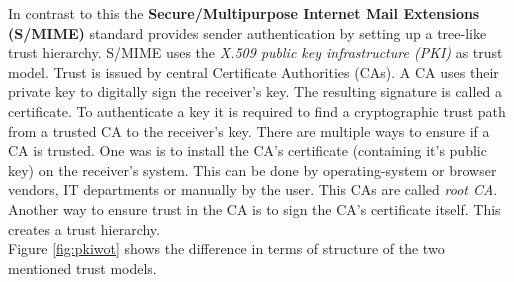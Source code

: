 In contrast to this the \textbf{Secure/Multipurpose Internet Mail Extensions (S/MIME)} standard provides sender authentication by setting up a tree-like trust hierarchy. S/MIME uses the \textit{X.509 public key infrastructure (PKI)} as trust model. Trust is issued by central Certificate Authorities (CAs). A CA uses their private key to digitally sign the receiver's key. The resulting signature is called a certificate. To authenticate a key it is required to find a cryptographic trust path from a trusted CA to the receiver's key. There are multiple ways to ensure if a CA is trusted. One was is to install the CA's certificate (containing it's public key) on the receiver's system. This can be done by operating-system or browser vendors, IT departments or manually by the user. This CAs are called \textit{root CA}. Another way to ensure trust in the CA is to sign the CA's certificate itself. This creates a trust hierarchy. \\

Figure \ref{fig:pkiwot} shows the difference in terms of structure of the two mentioned trust models.

